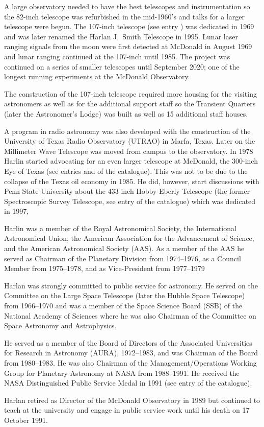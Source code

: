 A large observatory needed to have the best telescopes and
instrumentation so the 82-inch telescope was refurbished in the
mid-1960's and talks for a larger telescope were begun.  The 107-inch
telescope (see entry ) was dedicated in 1969 and was later
renamed the Harlan J.~Smith Telescope in 1995. Lunar laser ranging
signals from the moon were first detected at McDonald in August 1969 and
lunar ranging continued at the 107-inch until 1985. The project was
continued on a series of smaller telescopes until September 2020; one
of the longest running experiments at the McDonald Observatory.

The construction of the 107-inch telescope required more housing for the
visiting astronomers as well as for the additional support staff
so the Transient Quarters (later the Astronomer's Lodge) was
built as well as 15 additional staff houses.

A program in radio astronomy was also developed with the construction
of the University of Texas Radio Observatory (UTRAO) in Marfa,
Texas. Later on the Millimeter Wave Telescope was moved from campus to
the observatory. In 1978 Harlin started advocating for an even larger
telescope at McDonald, the 300-inch Eye of Texas (see
entries  and  of the catalogue). This was not to
be due to the collapse of the Texas oil economy in 1985. He did,
however, start discussions with Penn State University about the
433-inch Hobby-Eberly Telescope (the former Spectroscopic Survey
Telescope, see entry  of the catalogue) which was dedicated
in 1997,

Harlin was a member of the Royal Astronomical Society, the International
Astronomical Union, the American Association for the Advancement of
Science, and the American Astronomical Society (AAS). As a member of
the AAS he served as Chairman of the Planetary Division from
1974--1976, as a Council Member from 1975--1978, and as Vice-President
from 1977--1979

Harlan was strongly committed to public service for astronomy. He
served on the Committee on the Large Space Telescope
(later the Hubble Space Telescope) from 1966--1970 and was a member of the
Space Science Board (SSB) of the National Academy of Sciences where he
was also Chairman of the Committee on Space Astronomy and
Astrophysics.

He served as a member of the Board of Directors of the Associated
Universities for Research in Astronomy (AURA), 1972--1983, and was
Chairman of the Board from 1980--1983. He was also Chairman of the
Management/Operations Working Group for Planetary Astronomy at NASA
from 1988--1991.  He received the NASA Distinguished Public Service
Medal in 1991 (see entry  of the catalogue).

Harlan retired as Director of the McDonald Observatory in 1989  but
continued to teach at the university and engage in public service work
until his death on 17 October 1991.


